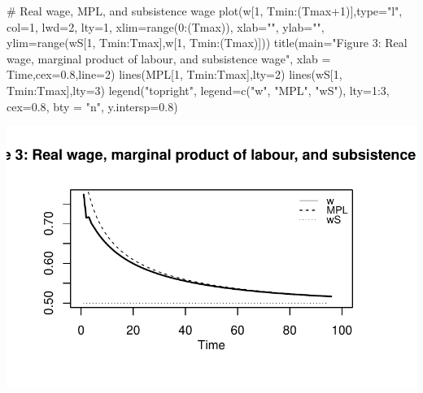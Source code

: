 \documentclass[
  letterpaper,
  DIV=11,
  numbers=noendperiod]{scrreprt}
\newenvironment{Shaded}{\begin{snugshade}}{\end{snugshade}}
\newcommand{\AttributeTok}[1]{\textcolor[rgb]{0.40,0.45,0.13}{#1}}
\newcommand{\CommentTok}[1]{\textcolor[rgb]{0.37,0.37,0.37}{#1}}
\newcommand{\DecValTok}[1]{\textcolor[rgb]{0.68,0.00,0.00}{#1}}
\newcommand{\FloatTok}[1]{\textcolor[rgb]{0.68,0.00,0.00}{#1}}
\newcommand{\FunctionTok}[1]{\textcolor[rgb]{0.28,0.35,0.67}{#1}}
\newcommand{\NormalTok}[1]{\textcolor[rgb]{0.00,0.23,0.31}{#1}}
\newcommand{\SpecialCharTok}[1]{\textcolor[rgb]{0.37,0.37,0.37}{#1}}
\newcommand{\StringTok}[1]{\textcolor[rgb]{0.13,0.47,0.30}{#1}}
\begin{document}
\begin{Shaded}
\begin{Highlighting}[]
\CommentTok{\# Real wage, MPL, and subsistence wage}
\FunctionTok{plot}\NormalTok{(w[}\DecValTok{1}\NormalTok{, Tmin}\SpecialCharTok{:}\NormalTok{(Tmax}\SpecialCharTok{+}\DecValTok{1}\NormalTok{)],}\AttributeTok{type=}\StringTok{"l"}\NormalTok{, }\AttributeTok{col=}\DecValTok{1}\NormalTok{, }\AttributeTok{lwd=}\DecValTok{2}\NormalTok{, }\AttributeTok{lty=}\DecValTok{1}\NormalTok{, }\AttributeTok{xlim=}\FunctionTok{range}\NormalTok{(}\DecValTok{0}\SpecialCharTok{:}\NormalTok{(Tmax)), }\AttributeTok{xlab=}\StringTok{""}\NormalTok{, }\AttributeTok{ylab=}\StringTok{""}\NormalTok{, }\AttributeTok{ylim=}\FunctionTok{range}\NormalTok{(wS[}\DecValTok{1}\NormalTok{, Tmin}\SpecialCharTok{:}\NormalTok{Tmax],w[}\DecValTok{1}\NormalTok{, Tmin}\SpecialCharTok{:}\NormalTok{(Tmax)])) }
\FunctionTok{title}\NormalTok{(}\AttributeTok{main=}\StringTok{"Figure 3: Real wage, marginal product of labour, and subsistence wage"}\NormalTok{, }\AttributeTok{xlab =} \StringTok{\textquotesingle{}Time\textquotesingle{}}\NormalTok{,}\AttributeTok{cex=}\FloatTok{0.8}\NormalTok{,}\AttributeTok{line=}\DecValTok{2}\NormalTok{)}
\FunctionTok{lines}\NormalTok{(MPL[}\DecValTok{1}\NormalTok{, Tmin}\SpecialCharTok{:}\NormalTok{Tmax],}\AttributeTok{lty=}\DecValTok{2}\NormalTok{)}
\FunctionTok{lines}\NormalTok{(wS[}\DecValTok{1}\NormalTok{, Tmin}\SpecialCharTok{:}\NormalTok{Tmax],}\AttributeTok{lty=}\DecValTok{3}\NormalTok{)}
\FunctionTok{legend}\NormalTok{(}\StringTok{"topright"}\NormalTok{, }\AttributeTok{legend=}\FunctionTok{c}\NormalTok{(}\StringTok{"w"}\NormalTok{, }\StringTok{"MPL"}\NormalTok{, }\StringTok{"wS"}\NormalTok{),}
       \AttributeTok{lty=}\DecValTok{1}\SpecialCharTok{:}\DecValTok{3}\NormalTok{, }\AttributeTok{cex=}\FloatTok{0.8}\NormalTok{, }\AttributeTok{bty =} \StringTok{"n"}\NormalTok{, }\AttributeTok{y.intersp=}\FloatTok{0.8}\NormalTok{)}
\end{Highlighting}
\end{Shaded}

\includegraphics{a_ricardian_two_sector_model_files/figure-pdf/ricardo2_2-3.pdf}
\end{document}
